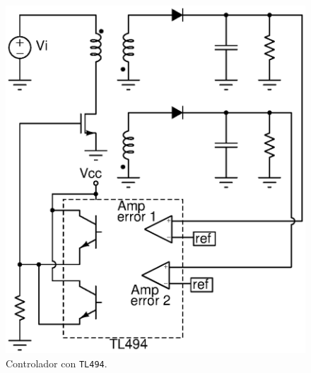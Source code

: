 \begin{figure}[H]
	\centering
	\includegraphics[scale=0.4]{Figuras/tl494.eps}
	\caption{Controlador con \texttt{TL494}.}
	\label{fig:cto_tl494}
\end{figure}

